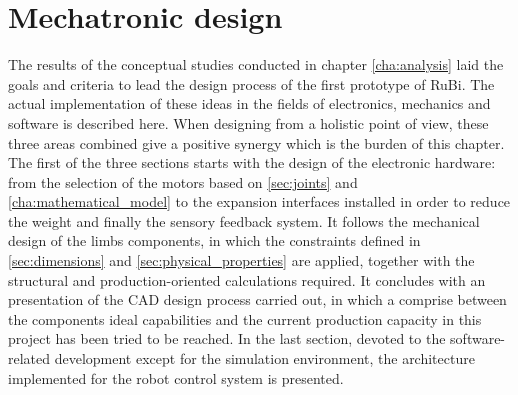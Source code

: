 \chapter{Mechatronic design} %
\label{cha:design}
The results of the conceptual studies conducted in chapter \ref{cha:analysis} laid the goals and criteria to lead the design process of the first prototype of RuBi.
The actual implementation of these ideas in the fields of electronics, mechanics and software is described here.
When designing from a holistic point of view, these three areas combined give a positive synergy which is the burden of this chapter.
The first of the three sections starts with the design of the electronic hardware: from the selection of the motors based on \ref{sec:joints} and \ref{cha:mathematical_model} to the expansion interfaces installed in order to reduce the weight and finally the sensory feedback system.
It follows the mechanical design of the limbs components, in which the constraints defined in \ref{sec:dimensions} and \ref{sec:physical_properties} are applied, together with the structural and production-oriented calculations required.
It concludes with an presentation of the CAD design process carried out, in which a comprise between the components ideal capabilities and the current production capacity in this project has been tried to be reached.
In the last section, devoted to the software-related development except for the simulation environment, the architecture implemented for the robot control system is presented.





